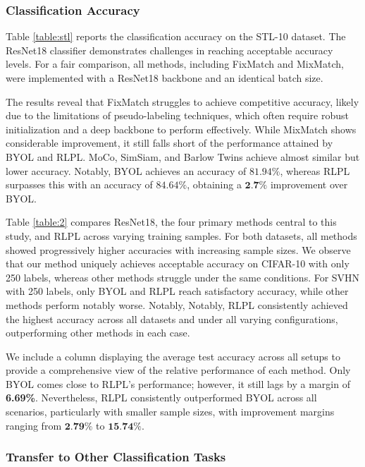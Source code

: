 \subsubsection{Classification Accuracy}

Table \ref{table:stl} reports the classification accuracy on the STL-10 dataset. The ResNet18 classifier demonstrates challenges in reaching acceptable accuracy levels. For a fair comparison, all methods, including FixMatch and MixMatch, were implemented with a ResNet18 backbone and an identical batch size.

The results reveal that FixMatch struggles to achieve competitive accuracy, likely due to the limitations of pseudo-labeling techniques, which often require robust initialization and a deep backbone to perform effectively. While MixMatch shows considerable improvement, it still falls short of the performance attained by BYOL and RLPL. MoCo, SimSiam, and Barlow Twins achieve almost similar but lower accuracy. Notably, BYOL achieves an accuracy of $81.94\%$, whereas RLPL surpasses this with an accuracy of $84.64\%$, obtaining a $\textbf{2.7\%}$ improvement over BYOL.

Table \ref{table:2} compares ResNet18, the four primary methods central to this study, and RLPL across varying training samples. For both datasets, all methods showed progressively higher accuracies with increasing sample sizes. We observe that our method uniquely achieves acceptable accuracy on CIFAR-10 with only 250 labels, whereas other methods struggle under the same conditions. For SVHN with 250 labels, only BYOL and RLPL reach satisfactory accuracy, while other methods perform notably worse. Notably, Notably, RLPL consistently achieved the highest accuracy across all datasets and under all varying configurations, outperforming other methods in each case.

We include a column displaying the average test accuracy across all setups to provide a comprehensive view of the relative performance of each method. Only BYOL comes close to RLPL's performance; however, it still lags by a margin of \textbf{6.69\%}. Nevertheless, RLPL consistently outperformed BYOL across all scenarios, particularly with smaller sample sizes, with improvement margins ranging from $\textbf{2.79\%}$ to $\textbf{15.74\%}$.

\subsubsection{Transfer to Other Classification Tasks}

